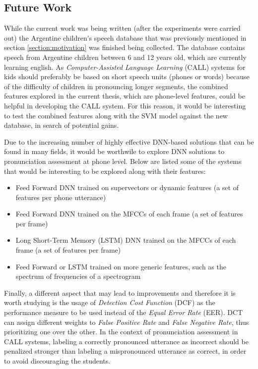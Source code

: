 \subsection{Future Work}

While the current work was being written (after the experiments were carried out)
the Argentine children's speech database that was previously mentioned in section
\ref{section:motivation} was finished being collected. The database contains speech
from Argentine children between 6 and 12 years old, which are currently learning
english. As \textit{Computer-Assisted Language Learning} (CALL) systems
for kids should preferably be based on short speech units (phones or words) because
of the difficulty of children in pronouncing longer segments, the combined features
explored in the current thesis, which are phone-level features, could be helpful
in developing the CALL system. For this reason, it would be interesting to test
the combined features along with the SVM model against the new database, in search
of potential gains.

Due to the increasing number of highly effective DNN-based solutions that can be found in
many fields, it would be worthwile to explore DNN solutions to pronunciation assessment
at phone level. Below are listed some of the systems that would be interesting to be explored
along with their features:

\begin{itemize}
  \item Feed Forward DNN trained on supervectors or dynamic features (a set of features per phone utterance)
  \item Feed Forward DNN trained on the MFCCs of each frame (a set of features per frame)
  \item Long Short-Term Memory (LSTM) DNN trained on the MFCCs of each frame (a set of features per frame)
  \item Feed Forward or LSTM trained on more generic features, such as the spectrum of frequencies of a spectrogram
\end{itemize}

Finally, a different aspect that may lead to improvements and therefore it is worth studying
is the usage of \textit{Detection Cost Function} (DCF) as the performance measure
to be used instead of the \textit{Equal Error Rate} (EER). DCT can assign different
weights to \textit{False Positive Rate} and \textit{False Negative Rate}, thus
prioritizing one over the other. In the context of pronunciation assessment in
CALL systems, labeling a correctly pronounced utterance as incorrect should be
penalized stronger than labeling a mispronounced utterance as correct, in order
to avoid discouraging the students.
